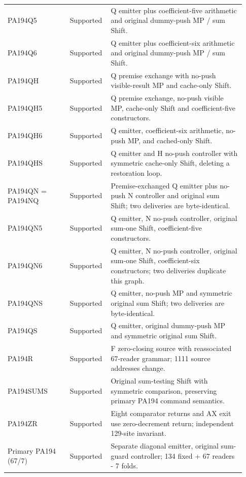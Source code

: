 \begin{longtable}{@{}p{0.25\linewidth}p{0.14\linewidth}p{0.54\linewidth}@{}}
PA194Q5 & Supported & Q emitter plus coefficient-five arithmetic and original dummy-push MP / sum Shift. \\
PA194Q6 & Supported & Q emitter plus coefficient-six arithmetic and original dummy-push MP / sum Shift. \\
PA194QH & Supported & Q premise exchange with no-push visible-result MP and cache-only Shift. \\
PA194QH5 & Supported & Q premise exchange, no-push visible MP, cache-only Shift and coefficient-five constructors. \\
PA194QH6 & Supported & Q emitter, coefficient-six arithmetic, no-push MP, and cached-only Shift. \\
PA194QHS & Supported & Q emitter and H no-push controller with symmetric cache-only Shift, deleting a restoration loop. \\
PA194QN = PA194NQ & Supported & Premise-exchanged Q emitter plus no-push N controller and original sum Shift; two deliveries are byte-identical. \\
PA194QN5 & Supported & Q emitter, N no-push controller, original sum-one Shift, coefficient-five constructors. \\
PA194QN6 & Supported & Q emitter, N no-push controller, original sum-one Shift, coefficient-six constructors; two deliveries duplicate this graph. \\
PA194QNS & Supported & Q emitter, no-push MP and symmetric original sum Shift; two deliveries are byte-identical. \\
PA194QS & Supported & Q emitter, original dummy-push MP and symmetric original sum Shift. \\
PA194R & Supported & F zero-closing source with reassociated 67-reader grammar; 1111 source addresses change. \\
PA194SUMS & Supported & Original sum-testing Shift with symmetric comparison, preserving primary PA194 command semantics. \\
PA194ZR & Supported & Eight comparator returns and AX exit use zero-decrement return; independent 129-site invariant. \\
Primary PA194 (67/7) & Supported & Separate diagonal emitter, original sum-guard controller; 134 fixed + 67 readers - 7 folds. \\
\bottomrule
\end{longtable}\endgroup

